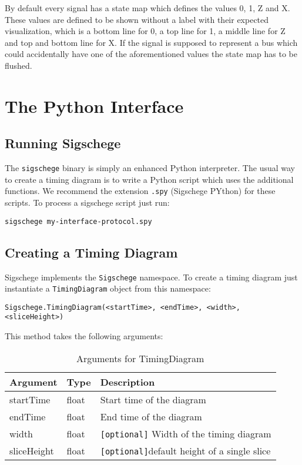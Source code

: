 \documentclass[11pt]{article}
\begin{document}
By default every signal has a state map which defines the values 0, 1, Z and
X. These values are defined to be shown without a label with their expected
visualization, which is a bottom line for 0, a top line for 1, a middle line for
Z and top and bottom line for X. If the signal is supposed to represent a bus
which could accidentally have one of the aforementioned values the state map has
to be flushed.


\section{The Python Interface}
\label{sec:python}

\subsection{Running Sigschege}

The \texttt{sigschege} binary is simply an enhanced Python interpreter. The
usual way to create a timing diagram is to write a Python script which uses the
additional functions. We recommend the extension \texttt{.spy} (Sigschege PYthon) for these
scripts. To process a sigschege script just run:

\begin{center}
  \texttt{sigschege my-interface-protocol.spy}
\end{center}


\subsection{Creating a Timing Diagram}

Sigschege implements the \texttt{Sigschege} namespace. To create a timing
diagram just instantiate a \texttt{TimingDiagram} object from this namespace:


\begin{center}
  \texttt{Sigschege.TimingDiagram(<startTime>, <endTime>, <width>, <sliceHeight>)}
\end{center}

This method takes the following arguments:

\begin{table}[htbp]
  \centering
  \begin{tabular}[l]{l|l|l}
    \textbf{Argument}&\textbf{Type}&\textbf{Description}\\\hline
    startTime&float&Start time of the diagram\\
    endTime&float&End time of the diagram\\
    width&float&\texttt{[optional]} Width of the timing diagram\\
    sliceHeight&float&\texttt{[optional]}default height of a single
    slice\\\hline
  \end{tabular}
  \caption{Arguments for TimingDiagram}
  \label{tab:timdiagram}
\end{table}
\end{document}
